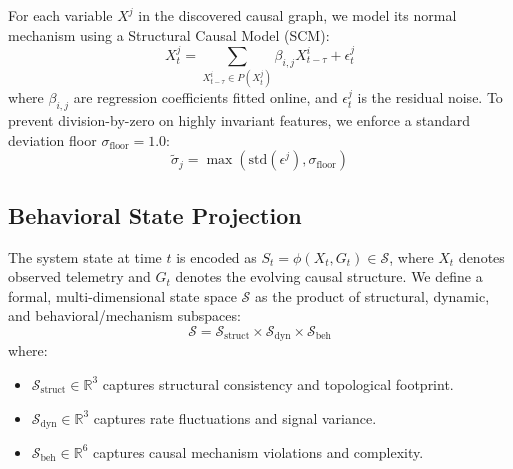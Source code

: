 For each variable $X^j$ in the discovered causal graph, we model its normal mechanism using a Structural Causal Model (SCM):
\begin{equation}
X^j_t = \sum_{X^i_{t-\tau} \in P(X^j_t)} \beta_{i,j} X^i_{t-\tau} + \epsilon^j_t
\end{equation}
where $\beta_{i,j}$ are regression coefficients fitted online, and $\epsilon^j_t$ is the residual noise. To prevent division-by-zero on highly invariant features, we enforce a standard deviation floor $\sigma_{\text{floor}} = 1.0$:
\begin{equation}
\tilde{\sigma}_j = \max(\text{std}(\epsilon^j), \sigma_{\text{floor}})
\end{equation}

\subsection{Behavioral State Projection}
The system state at time $t$ is encoded as $S_t = \phi(X_t, G_t) \in \mathcal{S}$, where $X_t$ denotes observed telemetry and $G_t$ denotes the evolving causal structure. We define a formal, multi-dimensional state space $\mathcal{S}$ as the product of structural, dynamic, and behavioral/mechanism subspaces:
\begin{equation}
\mathcal{S} = \mathcal{S}_{\text{struct}} \times \mathcal{S}_{\text{dyn}} \times \mathcal{S}_{\text{beh}}
\end{equation}
where:
\begin{itemize}
\item $\mathcal{S}_{\text{struct}} \in \mathbb{R}^3$ captures structural consistency and topological footprint.
\item $\mathcal{S}_{\text{dyn}} \in \mathbb{R}^3$ captures rate fluctuations and signal variance.
\item $\mathcal{S}_{\text{beh}} \in \mathbb{R}^6$ captures causal mechanism violations and complexity.
\end{itemize}

